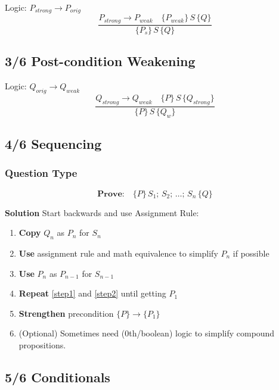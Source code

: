 Logic: \(P_{strong} \rightarrow P_{orig} \)
\begin{displaymath}
  \frac{P_{strong} \rightarrow P_{weak} \quad \{P_{weak}\}\,S\,\{Q\} } {\{P_{s}\}\,S\,\{Q\}}
\end{displaymath}

\subsection*{3/6 Post-condition Weakening}
Logic: \(Q_{orig} \rightarrow Q_{weak} \)
\begin{displaymath}
  \frac{Q_{strong}\rightarrow Q_{weak} \quad \{P\}\,S\,\{Q_{strong}\} } {\{P\}\,S\,\{Q_{w}\}}
\end{displaymath}

\subsection*{4/6 Sequencing}
\subsubsection*{Question Type}
{
  \setlength{\abovedisplayskip}{0pt}
  \setlength{\belowdisplayskip}{3pt}
  \setlength{\abovedisplayshortskip}{0pt}
  \setlength{\belowdisplayshortskip}{3pt}

  \[\textbf{Prove:}\quad \{P\}\,S_{1};\,S_{2};\,\ldots ;\,S_{n}\,\{Q\}\]
}
\textbf{Solution} Start backwards and use Assignment Rule:
\begin{enumerate}
\item\label{step1} \textbf{Copy} \(Q_{n}\) as \(P_{n}\) for \(S_{n}\)
\item\label{step2} \textbf{Use} assignment rule and math equivalence to simplify \(P_{n}\) if possible
\item \textbf{Use} \(P_{n}\) as \(P_{n-1}\) for \(S_{n-1}\)
\item \textbf{Repeat} \ref{step1} and \ref{step2} until getting \(P_{1}\)
\item \textbf{Strengthen} precondition \(\{P\}\rightarrow \{P_{1}\}\)
\item (Optional) Sometimes need (0th/boolean) logic to simplify compound propositions.

\end{enumerate}

\subsection*{5/6 Conditionals}

